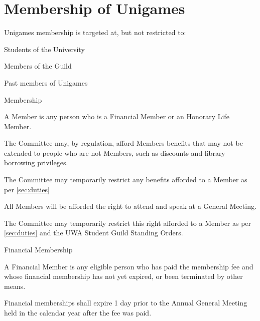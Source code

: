 \documentclass[a4paper]{article}
\begin{document}
\section{Membership of Unigames} \label{sec:membership}
\begin{myEnumerate}
    \item Unigames membership is targeted at, but not restricted to:
        \begin{myEnumerate}
            \item Students of the University
            \item Members of the Guild
            \item Past members of Unigames
        \end{myEnumerate}
    \item Membership
        \begin{myEnumerate}
            \item A Member is any person who is a Financial Member or an Honorary Life Member.
            \item The Committee may, by regulation, afford Members benefits that may not be extended to people who are not Members, such as discounts and library borrowing privileges.
                \begin{myEnumerate}
                    \item The Committee may temporarily restrict any benefits afforded to a Member as per \cref{sec:duties}
                \end{myEnumerate}
            \item All Members will be afforded the right to attend and speak at a General Meeting.
                \begin{myEnumerate}
                    \item The Committee may temporarily restrict this right afforded to a Member as per \cref{sec:duties} and the UWA Student Guild Standing Orders.
                \end{myEnumerate}
        \end{myEnumerate}
    \item Financial Membership
        \begin{myEnumerate}
            \item A Financial Member is any eligible person who has paid the membership fee and whose financial membership has not yet expired, or been terminated by other means.
                \begin{myEnumerate}
                    \item Financial memberships shall expire 1 day prior to the Annual General Meeting held in the calendar year after the fee was paid.

\end{myEnumerate}
\end{myEnumerate}
\end{myEnumerate}
\end{document}
